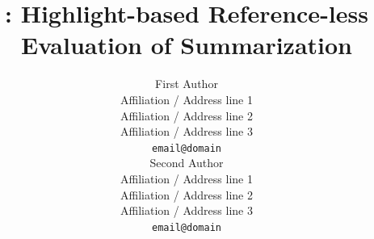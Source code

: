 \documentclass[11pt,a4paper]{article}
\title{\highres: Highlight-based Reference-less Evaluation of Summarization}
\author{First Author \\
  Affiliation / Address line 1 \\
  Affiliation / Address line 2 \\
  Affiliation / Address line 3 \\
  \texttt{email@domain} \\\And
  Second Author \\
  Affiliation / Address line 1 \\
  Affiliation / Address line 2 \\
  Affiliation / Address line 3 \\
  \texttt{email@domain} \\}
\date{}
\begin{document}
\maketitle
\begin{abstract}
  
  

\end{abstract}
\end{document}
